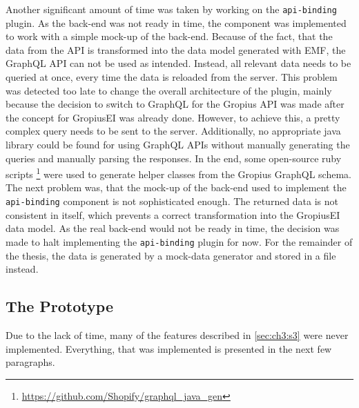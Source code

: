Another significant amount of time was taken by working on the \lstinline|api-binding| plugin.
As the back-end was not ready in time, the component was implemented to work with a simple mock-up of the back-end.
Because of the fact, that the data from the \gls{API} is transformed into the data model generated with \gls{EMF}, 
the GraphQL \gls{API} can not be used as intended.
Instead, all relevant data needs to be queried at once, every time the data is reloaded from the server.
This problem was detected too late to change the overall architecture of the plugin, 
mainly because the decision to switch to GraphQL for the Gropius \gls{API} was made after the concept for \gls{GropiusEI} was already done.
However, to achieve this, a pretty complex query needs to be sent to the server.
Additionally, no appropriate java library could be found for using GraphQL \glspl{API} without manually generating the queries and manually parsing the responses. 
In the end, some open-source ruby scripts \footnote{\url{https://github.com/Shopify/graphql_java_gen}} were used to generate helper classes from the Gropius GraphQL schema.
The next problem was, that the mock-up of the back-end used to implement the \lstinline|api-binding| component is not sophisticated enough.
The returned data is not consistent in itself, which prevents a correct transformation into the \gls{GropiusEI} data model.
As the real back-end would not be ready in time, the decision was made to halt implementing the \lstinline|api-binding| plugin for now.
For the remainder of the thesis, the data is generated by a mock-data generator and stored in a file instead.

\subsection*{The Prototype}
Due to the lack of time, many of the features described in \cref{sec:ch3:s3} were never implemented.
Everything, that was implemented is presented in the next few paragraphs.

